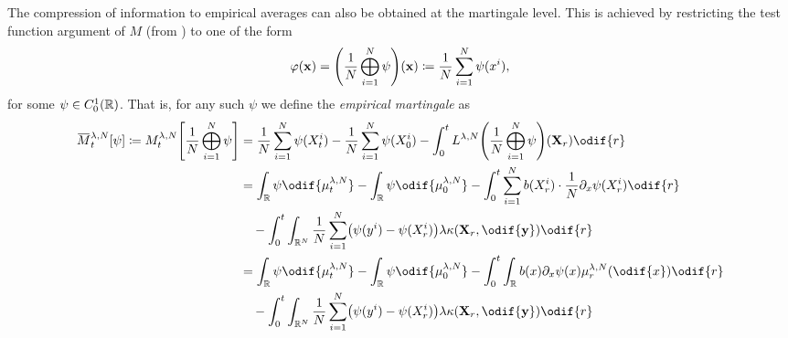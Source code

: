 The compression of information to empirical averages can also be obtained at the martingale level.
This is achieved by restricting the test function argument of \(M\) (from ) to one of the form
\begin{equation}
  \varphi(\bm{x}) = \br*{ \frac{1}{N} \bigoplus_{i=1}^N  \psi }(\bm{x})
  \coloneqq \frac{1}{N} \sum_{i=1}^N \psi(x^i),
\end{equation}
for some \(\psi \in C_0^1(\mathbb{R})\).
That is, for any such \( \psi \) we define the \textit{empirical martingale} as
\begin{equation}\label{eq:emp-M-derivation-start}
  \begin{split}
    \ol{M}_t^{\lambda, N}[\psi] \coloneqq
    M_t^{\lambda, N}\sbr*{\frac{1}{N} \bigoplus_{i=1}^N \psi}
     & = \frac{1}{N} \sum_{i=1}^N \psi(X_t^i) - \frac{1}{N} \sum_{i=1}^N \psi(X_0^i) - \int_0^t L^{\lambda, N} \br*{\frac{1}{N}\bigoplus_{i=1}^N \psi} (\bm{X}_r) \odif{r} \\
     & = \int_\potspace \psi \odif{\mu_t^{\lambda, N}} - \int_\potspace \psi \odif{\mu_0^{\lambda, N}}
    - \int_0^t \sum_{i=1}^N b(X_{r}^i) \cdot \frac{1}{N} \partial_{x} \psi(X_{r}^i) \odif{r}                                                                               \\
     & \quad - \int_0^t \int_{\potspace^N} \frac{1}{N} \sum_{i=1}^N \br*{ \psi(y^i) - \psi(X_{r}^i) } \lambda \kappa(\bm{X}_r, \odif{\bm{y}}) \odif{r}                     \\
     & = \int_\potspace \psi \odif{\mu_t^{\lambda, N}} - \int_\potspace \psi \odif{\mu_0^{\lambda, N}}
    - \int_0^t \int_\potspace b(x) \partial_{x} \psi(x) \mu_r^{\lambda, N}(\odif{x}) \odif{r}                                                                              \\
     & \quad - \int_0^t \int_{\potspace^N} \frac{1}{N} \sum_{i=1}^N \br*{ \psi(y^i) - \psi(X_{r}^i) } \lambda \kappa(\bm{X}_r, \odif{\bm{y}}) \odif{r}                     \\
  \end{split}
\end{equation}

